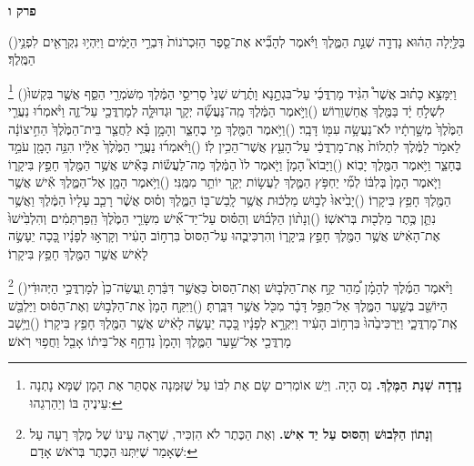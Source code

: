 \documentclass[12pt, openany]{book}
\newcommand{\chapname}{}
\newcommand{\newchap}[1]{
	\addcontentsline{toc}{chapter}{#1}
	\renewcommand{\chapname}{#1}
		\begin{center}
			\textbf{%
\fontsize{16pt}{16pt}\selectfont
				#1}
		\end{center}
}
\newcommand{\footnotecomment}[1]{
	\renewcommand\thefootnote{}
	\footnote{\textsf{#1}}}
\newcommand{\commenta}[1]{\footnotecomment{#1}\hspace{0em}}
\newcommand{\vsnum}[1]{(\hebrewnumeral{#1})\space}
\begin{document}
\newchap{פרק ו}
\begin{multicols}{2}
\vsnum{1}בַּלַּ֣יְלָה הַה֔וּא נָדְדָ֖ה שְׁנַ֣ת הַמֶּ֑לֶךְ וַיֹּ֗אמֶר לְהָבִ֞יא אֶת־סֵ֤פֶר הַזִּכְרֹנוֹת֙ דִּבְרֵ֣י הַיָּמִ֔ים וַיִּהְי֥וּ נִקְרָאִ֖ים לִפְנֵ֥י הַמֶּֽלֶךְ׃%
\commenta{\textrm{\textbf{נָדְדָה שְׁנַת הַמֶּלֶךְ.}} נֵס הָיָה. וְיֵשׁ אוֹמְרִים שָׂם אֶת לִבּוֹ עַל שֶׁזִּמְּנָה אֶסְתֵּר אֶת הָמָן שֶׁמָּא נָתְנָה עֵינֶיהָ בּוֹ וְיַהַרְגֵהוּ:}%
\vsnum{2}וַיִּמָּצֵ֣א כָת֗וּב אֲשֶׁר֩ הִגִּ֨יד מָרְדֳּכַ֜י עַל־בִּגְתָ֣נָא וָתֶ֗רֶשׁ שְׁנֵי֙ סָרִיסֵ֣י הַמֶּ֔לֶךְ מִשֹּׁמְרֵ֖י הַסַּ֑ף אֲשֶׁ֤ר בִּקְשׁוּ֙ לִשְׁלֹ֣חַ יָ֔ד בַּמֶּ֖לֶךְ אֲחַשְׁוֵרֽוֹשׁ׃
\vsnum{3}וַיֹּ֣אמֶר הַמֶּ֔לֶךְ מַֽה־נַּעֲשָׂ֞ה יְקָ֧ר וּגְדוּלָּ֛ה לְמָרְדֳּכַ֖י עַל־זֶ֑ה וַיֹּ֨אמְר֜וּ נַעֲרֵ֤י הַמֶּ֙לֶךְ֙ מְשָׁ֣רְתָ֔יו לֹא־נַעֲשָׂ֥ה עִמּ֖וֹ דָּבָֽר׃
\vsnum{4}וַיֹּ֥אמֶר הַמֶּ֖לֶךְ מִ֣י בֶחָצֵ֑ר וְהָמָ֣ן בָּ֗א לַחֲצַ֤ר בֵּית־הַמֶּ֙לֶךְ֙ הַחִ֣יצוֹנָ֔ה לֵאמֹ֣ר לַמֶּ֔לֶךְ לִתְלוֹת֙ אֶֽת־מָרְדֳּכַ֔י עַל־הָעֵ֖ץ אֲשֶׁר־הֵכִ֥ין לֽוֹ׃
\vsnum{5}וַיֹּ֨אמְר֜וּ נַעֲרֵ֤י הַמֶּ֙לֶךְ֙ אֵלָ֔יו הִנֵּ֥ה הָמָ֖ן עֹמֵ֣ד בֶּחָצֵ֑ר וַיֹּ֥אמֶר הַמֶּ֖לֶךְ יָבֽוֹא׃
\vsnum{6}וַיָּבוֹא֮ הָמָן֒ וַיֹּ֤אמֶר לוֹ֙ הַמֶּ֔לֶךְ מַה־לַעֲשׂ֕וֹת בָּאִ֕ישׁ אֲשֶׁ֥ר הַמֶּ֖לֶךְ חָפֵ֣ץ בִּיקָר֑וֹ וַיֹּ֤אמֶר הָמָן֙ בְּלִבּ֔וֹ לְמִ֞י יַחְפֹּ֥ץ הַמֶּ֛לֶךְ לַעֲשׂ֥וֹת יְקָ֖ר יוֹתֵ֥ר מִמֶּֽנִּי׃
\vsnum{7}וַיֹּ֥אמֶר הָמָ֖ן אֶל־הַמֶּ֑לֶךְ אִ֕ישׁ אֲשֶׁ֥ר הַמֶּ֖לֶךְ חָפֵ֥ץ בִּיקָרֽוֹ׃
\vsnum{8}יָבִ֙יאוּ֙ לְב֣וּשׁ מַלְכ֔וּת אֲשֶׁ֥ר לָֽבַשׁ־בּ֖וֹ הַמֶּ֑לֶךְ וְס֗וּס אֲשֶׁ֨ר רָכַ֤ב עָלָיו֙ הַמֶּ֔לֶךְ וַאֲשֶׁ֥ר נִתַּ֛ן כֶּ֥תֶר מַלְכ֖וּת בְּרֹאשֽׁוֹ׃
\vsnum{9}וְנָת֨וֹן הַלְּב֜וּשׁ וְהַסּ֗וּס עַל־יַד־אִ֞ישׁ מִשָּׂרֵ֤י הַמֶּ֙לֶךְ֙ הַֽפַּרְתְּמִ֔ים וְהִלְבִּ֙ישׁוּ֙ אֶת־הָאִ֔ישׁ אֲשֶׁ֥ר הַמֶּ֖לֶךְ חָפֵ֣ץ בִּֽיקָר֑וֹ וְהִרְכִּיבֻ֤הוּ עַל־הַסּוּס֙ בִּרְח֣וֹב הָעִ֔יר וְקָרְא֣וּ לְפָנָ֔יו כָּ֚כָה יֵעָשֶׂ֣ה לָאִ֔ישׁ אֲשֶׁ֥ר הַמֶּ֖לֶךְ חָפֵ֥ץ בִּיקָרֽוֹ׃%
\commenta{\textrm{\textbf{וְנָתוֹן הַלְּבוּשׁ וְהַסּוּס עַל יַד אִישׁ.}} וְאֶת הַכֶּתֶר לֹא הִזְכִּיר, שֶׁרָאָה עֵינוֹ שֶׁל מֶלֶךְ רָעָה עַל שֶׁאָמַר שֶׁיִּתְּנוּ הַכֶּתֶר בְּרֹאשׁ אָדָם: }%
\vsnum{10}וַיֹּ֨אמֶר הַמֶּ֜לֶךְ לְהָמָ֗ן מַ֠הֵר קַ֣ח אֶת־הַלְּב֤וּשׁ וְאֶת־הַסּוּס֙ כַּאֲשֶׁ֣ר דִּבַּ֔רְתָּ וַֽעֲשֵׂה־כֵן֙ לְמָרְדֳּכַ֣י הַיְּהוּדִ֔י הַיּוֹשֵׁ֖ב בְּשַׁ֣עַר הַמֶּ֑לֶךְ אַל־תַּפֵּ֣ל דָּבָ֔ר מִכֹּ֖ל אֲשֶׁ֥ר דִּבַּֽרְתָּ׃
\vsnum{11}וַיִּקַּ֤ח הָמָן֙ אֶת־הַלְּב֣וּשׁ וְאֶת־הַסּ֔וּס וַיַּלְבֵּ֖שׁ אֶֽת־מָרְדֳּכָ֑י וַיַּרְכִּיבֵ֙הוּ֙ בִּרְח֣וֹב הָעִ֔יר וַיִּקְרָ֣א לְפָנָ֔יו כָּ֚כָה יֵעָשֶׂ֣ה לָאִ֔ישׁ אֲשֶׁ֥ר הַמֶּ֖לֶךְ חָפֵ֥ץ בִּיקָרֽוֹ׃
\vsnum{12}וַיָּ֥שָׁב מָרְדֳּכַ֖י אֶל־שַׁ֣עַר הַמֶּ֑לֶךְ וְהָמָן֙ נִדְחַ֣ף אֶל־בֵּית֔וֹ אָבֵ֖ל וַחֲפ֥וּי רֹֽאשׁ׃%

\end{multicols}
\end{document}
